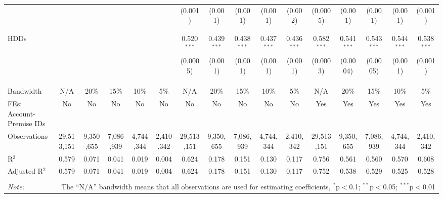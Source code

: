 \begin{table}[!htbp]
\begin{adjustbox}{scale = 0.8}
\begin{tabular}{@{\extracolsep{-7pt}}lccccccccccccccc}
  &  &  &  &  &  & (0.001) & (0.001) & (0.001) & (0.001) & (0.002) & (0.0005) & (0.001) & (0.001) & (0.001) & (0.001) \\ 
  & & & & & & & & & & & & & & & \\ 
  & & & & & & & & & & & & & & & \\
 HDDs &  &  &  &  &  & 0.520$^{***}$ & 0.439$^{***}$ & 0.438$^{***}$ & 0.437$^{***}$ & 0.436$^{***}$ & 0.582$^{***}$ & 0.541$^{***}$ & 0.543$^{***}$ & 0.544$^{***}$ & 0.538$^{***}$ \\ 
  &  &  &  &  &  & (0.0005) & (0.001) & (0.001) & (0.001) & (0.001) & (0.0003) & (0.0004) & (0.0005) & (0.001) & (0.001) \\ 
  & & & & & & & & & & & & & & & \\
  & & & & & & & & & & & & & & & \\ 
\hline \\[-1.8ex] 
Bandwidth & N/A & 20\% & 15\% & 10\% & 5\% & N/A & 20\% & 15\% & 10\% & 5\% & N/A & 20\% & 15\% & 10\% & 5\% \\ 
FEs: Account-Premise IDs & No & No & No & No & No & No & No & No & No & No & Yes & Yes & Yes & Yes & Yes \\ 
Observations & 29,513,151 & 9,350,655 & 7,086,939 & 4,744,344 & 2,410,342 & 29,513,151 & 9,350,655 & 7,086,939 & 4,744,344 & 2,410,342 & 29,513,151 & 9,350,655 & 7,086,939 & 4,744,344 & 2,410,342 \\ 
R$^{2}$ & 0.579 & 0.071 & 0.041 & 0.019 & 0.004 & 0.624 & 0.178 & 0.151 & 0.130 & 0.117 & 0.756 & 0.561 & 0.560 & 0.570 & 0.608 \\ 
Adjusted R$^{2}$ & 0.579 & 0.071 & 0.041 & 0.019 & 0.004 & 0.624 & 0.178 & 0.151 & 0.130 & 0.117 & 0.752 & 0.538 & 0.529 & 0.525 & 0.528 \\ 
\hline 
\hline \\[-1.8ex] 
\textit{Note:}  & \multicolumn{15}{r}{The ``N/A'' bandwidth means that all observations are used for estimating coefficients, $^{*}$p$<$0.1; $^{**}$p$<$0.05; $^{***}$p$<$0.01} \\ 
\end{tabular} 

\end{adjustbox}

\end{table} 
